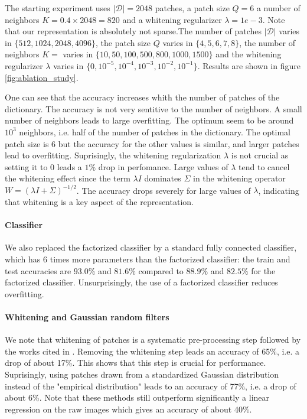 \documentclass{article}
\begin{document}
{The starting experiment uses  $|\mathcal{D}|=2048$ patches, a patch size $Q=6$ a number of neighbors $K=0.4\times 2048 = 820$ and a whitening regularizer $\lambda=1e-3$.
Note that our representation is absolutely not sparse.The number of patches $|\mathcal{D}|$ varies in $\lbrace 512, 1024, 2048, 4096 \rbrace$, the patch size $Q$ varies in $\lbrace 4, 5, 6, 7, 8 \rbrace$, the number of neighbors $K=
$ varies in $\lbrace 10, 50, 100, 500, 800, 1000, 1500 \rbrace$ and  the whitening regularizer $\lambda$ varies in $\lbrace0, 10^{-5}, 10^{-4}, 10^{-3}, 10^{-2}, 10^{-1}\rbrace$.
Results are shown in figure \ref{fig:ablation_study}.

One can see that the accuracy increases whith the number of patches of the dictionary.
The accuracy is not very sentitive to the number of neighbors.
A small number of neighbors leads to large overfitting.
The optimum seem to be around $10^3$ neighbors, i.e. half of the number of patches in the dictionary.
The optimal patch size is $6$ but the accuracy for the other values is similar, and larger patches lead to overfitting.
Suprisingly, the whitening regularization $\lambda$ is not crucial as setting it to $0$ leads a $1\%$ drop in perfomance.
Large values of $\lambda$ tend to cancel the whitening effect since the term $\lambda I$ dominates $\Sigma$ in the whitening operator $W = (\lambda I+\Sigma)^{-1/2}$.
The accuracy drops severely for large values of $\lambda$, indicating that whitening is a key aspect of the representation.

\paragraph{Classifier}
We also replaced the factorized classifier by a standard fully connected classifier, which has $6$ times more parameters than the factorized classifier: the train and test accuracies are $93.0\%$ and $81.6\%$ compared to $88.9\%$ and $82.5\%$ for the factorized classifier.
Unsurprisingly, the use of a factorized classifier reduces overfitting.

\paragraph{Whitening and Gaussian random filters} We note that whitening of patches is a systematic pre-processing step followed by the works cited in \cite{}.
Removing the whitening step leads an accuracy of 65\%, i.e. a drop  of about 17\%.
This shows that this step is crucial for performance.
Suprisingly, using patches drawn from a standardized Gaussian distribution  instead of  the "empirical distribution" leads to an accuracy of 77\%, i.e. a drop of about 6\%.
Note that these methods still outperform significantly a linear regression on the raw images which gives an accuracy of about 40\%.


}
\end{document}
